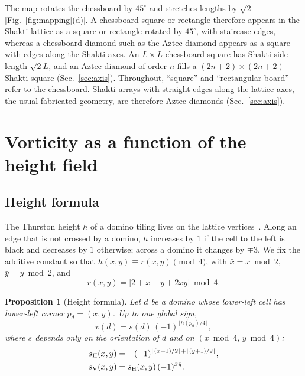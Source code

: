 \documentclass[aps,prb,twocolumn,floatfix,longbibliography]{revtex4-2}
\newtheorem{proposition}{Proposition}
\newcommand{\floor}[1]{\lfloor #1\rfloor}
\begin{document}
The map rotates the chessboard by $45^\circ$ and stretches lengths by $\sqrt2$ [Fig.~\ref{fig:mapping}(d)]. A chessboard square or rectangle therefore appears in the Shakti lattice as a square or rectangle rotated by $45^\circ$, with staircase edges, whereas a chessboard diamond such as the Aztec diamond appears as a square with edges along the Shakti axes. An $L\times L$ chessboard square has Shakti side length $\sqrt2L$, and an Aztec diamond of order $n$ fills a $(2n+2)\times(2n+2)$ Shakti square (Sec.~\ref{sec:axis}). Throughout, ``square'' and ``rectangular board'' refer to the chessboard. Shakti arrays with straight edges along the lattice axes, the usual fabricated geometry, are therefore Aztec diamonds (Sec.~\ref{sec:axis}).

\section{Vorticity as a function of the height field}
\label{sec:height}

\subsection{Height formula}

The Thurston height $h$ of a domino tiling lives on the lattice vertices~\cite{Thurston1990}. Along an edge that is not crossed by a domino, $h$ increases by $1$ if the cell to the left is black and decreases by $1$ otherwise; across a domino it changes by $\mp3$. We fix the additive constant so that $h(x,y)\equiv r(x,y)\pmod 4$, with $\bar x=x\bmod 2$, $\bar y=y\bmod2$, and
\begin{equation}
r(x,y)=\bigl[2+\bar x-\bar y+2\bar x\bar y\bigr]\bmod 4 .
\label{eq:residue}
\end{equation}

\begin{proposition}[Height formula]
Let $d$ be a domino whose lower-left cell has lower-left corner $p_d=(x,y)$. Up to one global sign,
\begin{equation}
v(d)=s(d)\,(-1)^{\floor{h(p_d)/4}},
\label{eq:vformula}
\end{equation}
where $s$ depends only on the orientation of $d$ and on $(x\bmod4,\,y\bmod4)$:
\begin{equation}
\begin{aligned}
s_{\rm H}(x,y)&=-(-1)^{\floor{(x+1)/2}+\floor{(y+1)/2}},\\
s_{\rm V}(x,y)&=s_{\rm H}(x,y)\,(-1)^{\bar x\bar y}.
\end{aligned}
\label{eq:sfactor}
\end{equation}
\end{proposition}
\end{document}
